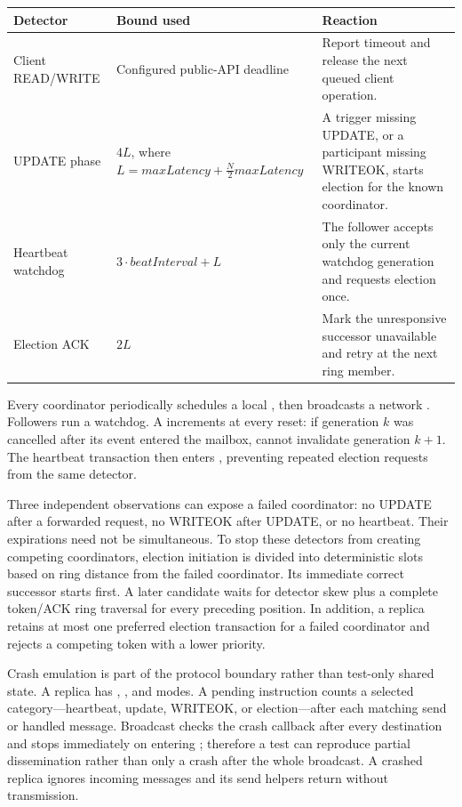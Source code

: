 \noindent\begin{tabularx}{\textwidth}{@{}p{32mm} X X@{}}
\toprule
Detector & Bound used & Reaction \\
\midrule
Client READ/WRITE & Configured public-API deadline & Report timeout and release the next queued client operation. \\
UPDATE phase & $4L$, where $L=maxLatency+\frac{N}{2}maxLatency$ & A trigger missing UPDATE, or a participant missing WRITEOK, starts election for the known coordinator. \\
Heartbeat watchdog & $3\cdot beatInterval+L$ & The follower accepts only the current watchdog generation and requests election once. \\
Election ACK & $2L$ & Mark the unresponsive successor unavailable and retry at the next ring member. \\
\bottomrule
\end{tabularx}

Every coordinator periodically schedules a local , then broadcasts a network . Followers run a watchdog. A  increments at every reset: if generation $k$ was cancelled after its event entered the mailbox,  cannot invalidate generation $k+1$. The heartbeat transaction then enters , preventing repeated election requests from the same detector.

Three independent observations can expose a failed coordinator: no UPDATE after a forwarded request, no WRITEOK after UPDATE, or no heartbeat. Their expirations need not be simultaneous. To stop these detectors from creating competing coordinators, election initiation is divided into deterministic slots based on ring distance from the failed coordinator. Its immediate correct successor starts first. A later candidate waits for detector skew plus a complete token/ACK ring traversal for every preceding position. In addition, a replica retains at most one preferred election transaction for a failed coordinator and rejects a competing token with a lower priority.

Crash emulation is part of the protocol boundary rather than test-only shared state. A replica has , , and  modes. A pending instruction counts a selected category---heartbeat, update, WRITEOK, or election---after each matching send or handled message. Broadcast checks the crash callback after every destination and stops immediately on entering ; therefore a test can reproduce partial dissemination rather than only a crash after the whole broadcast. A crashed replica ignores incoming messages and its send helpers return without transmission.


